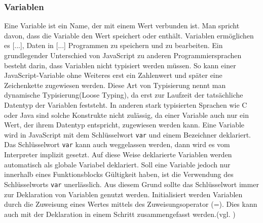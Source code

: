 \subsubsection{Variablen} \glqq Eine Variable ist ein Name, der mit einem Wert verbunden ist. Man spricht davon, dass die Variable den Wert speichert oder enthält. Variablen ermöglichen es [...], Daten in [...] Programmen zu speichern und zu bearbeiten.\grqq{}\cite[S.51]{FlanJava2007} Ein grundlegender Unterschied von JavaScript zu anderen Programmiersprachen besteht darin, dass Variablen nicht typisiert werden müssen. So kann einer JavaScript-Variable ohne Weiteres erst ein Zahlenwert und später eine Zeichenkette zugewiesen werden. Diese Art von Typisierung nennt man dynamische Typisierung(Loose Typing), da erst zur Laufzeit der tatsächliche Datentyp der Variablen feststeht. In anderen stark typisierten Sprachen wie C oder Java sind solche Konstrukte nicht zulässig, da einer Variable auch nur ein Wert, der ihrem Datentyp entspricht, zugewiesen werden kann. Eine Variable wird in JavaScript mit dem Schlüsselwort \texttt{var} und einem Bezeichner deklariert. Das Schlüsselwort \texttt{var} kann auch weggelassen werden, dann wird es vom Interpreter implizit gesetzt. Auf diese Weise deklarierte Variablen werden automatisch als globale Variabel deklariert. Soll eine Variable jedoch nur innerhalb eines Funktionsblocks Gültigkeit haben, ist die Verwendung des Schlüsselworts \texttt{var} unerlässlich. Aus diesem Grund sollte das Schlüsselwort immer zur Deklaration von Variablen genutzt werden. Initialisiert werden Variablen durch die Zuweisung eines Wertes mittels des Zuweisungsoperator (=). Dies kann auch mit der Deklaration in einem Schritt zusammengefasst werden.(vgl. \cite[S.52ff]{FlanJava2007})

